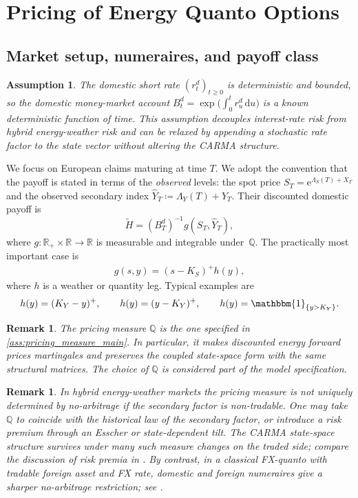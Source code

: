 \documentclass[10pt,reqno]{amsart}
\newtheorem{remark}[theorem]{Remark}
\newtheorem{assumption}[theorem]{Assumption}
\newcommand{\R}{\mathbb{R}}
\newcommand{\Q}{\mathbb{Q}}
\newcommand{\1}{\mathbbm{1}}
\newcommand{\dd}{\mathrm{d}}
\newcommand{\ee}{\mathrm{e}}
\begin{document}
\section{Pricing of Energy Quanto Options}\label{sec:pricing-quanto-options}

\subsection{Market setup, numeraires, and payoff class}

\begin{assumption}\label{ass:interest_rate}
The domestic short rate $(r_t^d)_{t \ge 0}$ is deterministic and bounded,
so the domestic money-market account
$B_t^d = \exp\!\bigl(\int_0^t r_u^d\,\dd u\bigr)$ is a known deterministic
function of time. This assumption decouples interest-rate risk from hybrid
energy-weather risk and can be relaxed by appending a stochastic rate factor to
the state vector without altering the CARMA structure.
\end{assumption}

We focus on European claims maturing at time $T$. We adopt the convention
that the payoff is stated in terms of the \emph{observed} levels: the spot
price $S_T = \ee^{\Lambda_S(T)+X_T}$ and the observed secondary index
$\widehat{Y}_T \coloneqq \Lambda_Y(T)+Y_T$. Their discounted domestic payoff
is
$$
\widetilde{H}
= (B_T^d)^{-1} g(S_T,\widehat{Y}_T),
$$
where $g:\R_+ \times \R \to \R$ is measurable and integrable under~$\Q$.
The practically most important case is
\begin{align}\label{eq:quanto_payoff_general}
  g(s,y) = (s-K_S)^+ h(y),
\end{align}
where $h$ is a weather or quantity leg. Typical examples are
$$
h(y) = (K_Y-y)^+,\qquad
h(y) = (y-K_Y)^+,\qquad
h(y) = \1_{\{y>K_Y\}}.
$$

\begin{remark}
The pricing measure $\Q$ is the one specified in
\ref{ass:pricing_measure_main}. In particular, it
makes discounted energy forward prices martingales and preserves the coupled
state-space form with the same structural matrices. The choice of $\Q$ is
considered part of the model specification.
\end{remark}

\begin{remark}
In hybrid energy-weather markets the pricing measure is not uniquely
determined by no-arbitrage if the secondary factor is non-tradable. One may
take $\Q$ to coincide with the historical law of the secondary factor, or
introduce a risk premium through an Esscher or state-dependent tilt. The
CARMA state-space structure survives under many such measure changes on the
traded side; compare the discussion of risk premia in \citet{Ben14}. By
contrast, in a classical FX-quanto with tradable foreign asset and FX rate,
domestic and foreign numeraires give a sharper no-arbitrage restriction; see
\citet{Hul21}.
\end{remark}
\end{document}

